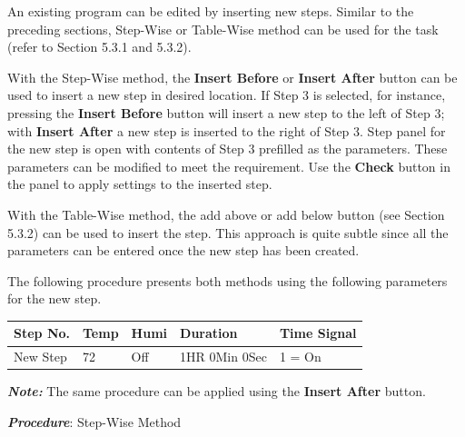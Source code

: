 An existing program can be edited by inserting new steps. Similar to the
preceding sections, Step-Wise or Table-Wise method can be used for the
task (refer to Section 5.3.1 and 5.3.2).

With the Step-Wise method, the \textbf{Insert Before} or \textbf{Insert
After} button can be used to insert a new step in desired location. If
Step 3 is selected, for instance, pressing the \textbf{Insert Before}
button will insert a new step to the left of Step 3; with \textbf{Insert
After} a new step is inserted to the right of Step 3. Step panel for the
new step is open with contents of Step 3 prefilled as the parameters.
These parameters can be modified to meet the requirement. Use the
\textbf{Check} button in the panel to apply settings to the inserted
step.

With the Table-Wise method, the add above or add below button (see
Section 5.3.2) can be used to insert the step. This approach is quite
subtle since all the parameters can be entered once the new step has
been created.

The following procedure presents both methods using the following
parameters for the new step.

\begin{longtable}[]{@{}lllll@{}}
\toprule
Step No. & Temp & Humi & Duration & Time Signal\tabularnewline
\midrule
\endhead
New Step & 72 & Off & 1HR 0Min 0Sec & 1 = On\tabularnewline
\bottomrule
\end{longtable}

\textbf{\emph{Note:}} The same procedure can be applied using the
\textbf{Insert After} button.

\pagebreak
\textbf{\emph{Procedure}}: Step-Wise Method


